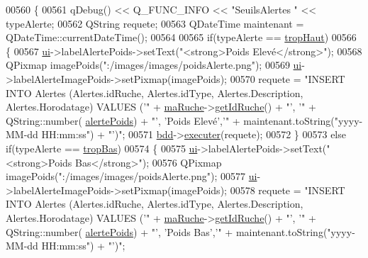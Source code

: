 \begin{DoxyCode}
00560 \{
00561     qDebug() << Q\_FUNC\_INFO << \textcolor{stringliteral}{"SeuilsAlertes "} << typeAlerte;
00562     QString requete;
00563     QDateTime maintenant = QDateTime::currentDateTime();
00564 
00565     \textcolor{keywordflow}{if}(typeAlerte == \hyperlink{parametres_8h_aaa6de8207c94675264c90b10b613368dabc650d9700ae19f2696e6a6e3f9ab067}{tropHaut})
00566     \{
00567         \hyperlink{class_ruche_ihm_a64786058bd7f88ca2f1e9743bb27c25b}{ui}->labelAlertePoids->setText(\textcolor{stringliteral}{"<strong>Poids Elevé</strong>"});
00568         QPixmap imagePoids(\textcolor{stringliteral}{":/images/images/poidsAlerte.png"});
00569         \hyperlink{class_ruche_ihm_a64786058bd7f88ca2f1e9743bb27c25b}{ui}->labelAlerteImagePoids->setPixmap(imagePoids);
00570         requete = \textcolor{stringliteral}{"INSERT INTO Alertes (Alertes.idRuche, Alertes.idType, Alertes.Description,
       Alertes.Horodatage) VALUES ('"} + \hyperlink{class_ruche_ihm_a43a6b1fa31f4fba58d919daae3707b38}{maRuche}->\hyperlink{class_ruche_a9f2de5ef29557ec7a53d5e22df34d164}{getIdRuche}() + \textcolor{stringliteral}{"', '"} + QString::number(
      \hyperlink{parametres_8h_a83a725fd153179a2bd97afcc8307737ba130a82230092934eb515b95603d12956}{alertePoids}) + \textcolor{stringliteral}{"', 'Poids Elevé','"} + maintenant.toString(\textcolor{stringliteral}{"yyyy-MM-dd  HH:mm:ss"}) + \textcolor{stringliteral}{"')"};
00571         \hyperlink{class_ruche_ihm_a0851936fe212e8d40538264f09749153}{bdd}->\hyperlink{class_base_de_donnees_aa8de5f8f8bb17edc43f5c0ee33712081}{executer}(requete);
00572     \}
00573     \textcolor{keywordflow}{else} \textcolor{keywordflow}{if}(typeAlerte == \hyperlink{parametres_8h_aaa6de8207c94675264c90b10b613368da4257e2f8921856770c8266f55c937295}{tropBas})
00574     \{
00575         \hyperlink{class_ruche_ihm_a64786058bd7f88ca2f1e9743bb27c25b}{ui}->labelAlertePoids->setText(\textcolor{stringliteral}{"<strong>Poids Bas</strong>"});
00576         QPixmap imagePoids(\textcolor{stringliteral}{":/images/images/poidsAlerte.png"});
00577         \hyperlink{class_ruche_ihm_a64786058bd7f88ca2f1e9743bb27c25b}{ui}->labelAlerteImagePoids->setPixmap(imagePoids);
00578         requete = \textcolor{stringliteral}{"INSERT INTO Alertes (Alertes.idRuche, Alertes.idType, Alertes.Description,
       Alertes.Horodatage) VALUES ('"} + \hyperlink{class_ruche_ihm_a43a6b1fa31f4fba58d919daae3707b38}{maRuche}->\hyperlink{class_ruche_a9f2de5ef29557ec7a53d5e22df34d164}{getIdRuche}() + \textcolor{stringliteral}{"', '"} + QString::number(
      \hyperlink{parametres_8h_a83a725fd153179a2bd97afcc8307737ba130a82230092934eb515b95603d12956}{alertePoids}) + \textcolor{stringliteral}{"', 'Poids Bas','"} + maintenant.toString(\textcolor{stringliteral}{"yyyy-MM-dd  HH:mm:ss"}) + \textcolor{stringliteral}{"')"};

\end{DoxyCode}

